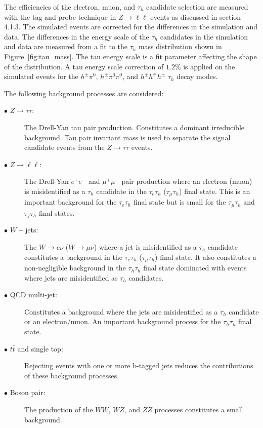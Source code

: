 The efficiencies of the electron, muon, and $\tau_h$ candidate selection are measured with the tag-and-probe technique in $Z\rightarrow \ell\ell$ events as discussed in section 4.1.3. The simulated events are corrected for the differences in the simulation and data. The differences in the energy scale of the $\tau_h$ candidates in the simulation and data are measured from a fit to the $\tau_h$ mass distribution shown in Figure~\ref{fig:tau_mass}. The tau energy scale is a fit parameter affecting the shape of the distribution. A tau energy scale correction of $1.2\%$ is applied on the simulated events for the $h^{\pm}\pi^{0}$,  $h^{\pm}\pi^{0}\pi^{0}$, and $h^{\pm}h^{\mp}h^{\pm}$ $\tau_{h}$ decay modes. 

The following background processes are considered:
\begin{description}
\item[$\bullet$ $Z\rightarrow\tau\tau$:] The Drell-Yan tau pair production. Constitutes a dominant irreducible background. Tau pair invariant mass is used to separate the signal candidate events from the  $Z\rightarrow\tau\tau$ events.
\item[$\bullet$ $Z\rightarrow\ell\ell$:] The Drell-Yan $e^+e^-$ and $\mu^+\mu^-$ pair production where an electron (muon) is misidentified as a $\tau_h$ candidate in the $\tau_{e}\tau_h$ ($\tau_{\mu}\tau_h$) final state. This is an important background for the $\tau_{e}\tau_h$ final state but is small for the $\tau_{\mu}\tau_h$ and $\tau_{f}\tau_h$ final states.  
\item[$\bullet$ $W+$jets:] The $W\rightarrow e\nu$ ($W\rightarrow \mu\nu$) where a jet is misidentified as a $\tau_h$ candidate constitutes a background in the $\tau_{e}\tau_h$ ($\tau_{\mu}\tau_h$) final state. It also constitutes a non-negligible background in the $\tau_{h}\tau_h$ final state dominated with events where jets are misidentified as  $\tau_h$ candidates. 
\item[$\bullet$ QCD multi-jet:] Constitutes a background where the jets are misidentified as a $\tau_h$ candidate or an electron/muon. An important background process for the $\tau_h\tau_h$ final state. 
\item[$\bullet$ $t\bar{t}$ and single top:] Rejecting events with one or more  b-tagged jets reduces the contributions of these background processes.
\item[$\bullet$ Boson pair:] The production of the $WW$, $WZ$, and $ZZ$ processes constitutes a small background.
\end{description}    

